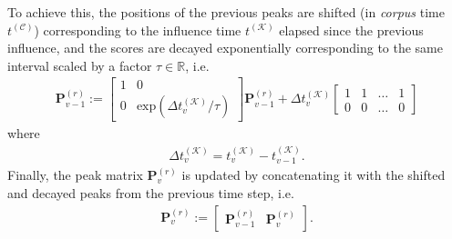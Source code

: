 To achieve this, the positions of the previous peaks are shifted (in \textit{corpus} time $t^{(\mathcal C)}$) corresponding to the influence time $t^{(\mathcal K)}$ elapsed since the previous influence, and the scores are decayed exponentially corresponding to the same interval scaled by a factor $\tau \in \mathbb R$, i.e.
\begin{align}
	\bm P_{v-1}^{(r)} := \begin{bmatrix} 
							1 & 0 
							\\ 0 & \text{exp}\left(\Delta t_v^{(\mathcal K)}/\tau\right)
				         \end{bmatrix}	
				         \bm P_{v-1}^{(r)}
				         + \Delta t_v^{(\mathcal K)} \begin{bmatrix}
				         		1 & 1 & \dots & 1\\				         
				         		0 & 0 & \dots & 0
				           \end{bmatrix}
\end{align}
where
\begin{align}
	\Delta t^{(\mathcal K)}_v = t^{(\mathcal K)}_v - t^{(\mathcal K)}_{v-1}.
\end{align}
Finally, the peak matrix $\bm P^{(r)}_v$ is updated by concatenating it with the shifted and decayed peaks from the previous time step, i.e.
\begin{align}\label{eq:3-influence-concatenation}
	\bm P^{(r)}_v := \begin{bmatrix} \bm P_{v-1}^{(r)} & \bm P_v^{(r)} \end{bmatrix}.
\end{align}


